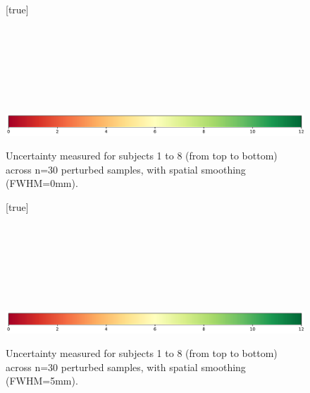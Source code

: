 \documentclass{article}
\begin{document}
\begin{appendices}
    \begin{landscape}
        \begin{figure}
            \vspace*{-2cm}
            \centering
            [true] \\
             \\
             \\
             \\
             \\
             \\
             \\
             \\
            \includegraphics*[width=.7\linewidth]{figures/colorbar_sigbit.pdf}
            \caption{Uncertainty measured for subjects 1 to 8 (from top to bottom) across n=30 perturbed samples, with spatial smoothing (FWHM=0mm). }
            \label{fig:uncertainty-maps-0mm}
        \end{figure}
    \end{landscape}

    \begin{landscape}
        \begin{figure}
            \vspace*{-2cm}
            \centering
            [true] \\
             \\
             \\
             \\
             \\
             \\
             \\
             \\
            \includegraphics*[width=.7\linewidth]{figures/colorbar_sigbit.pdf}
            \caption{Uncertainty measured for subjects 1 to 8 (from top to bottom) across n=30 perturbed samples, with spatial smoothing (FWHM=5mm). }
            \label{fig:uncertainty-maps-5mm}
        \end{figure}
    \end{landscape}


\end{appendices}
\end{document}
